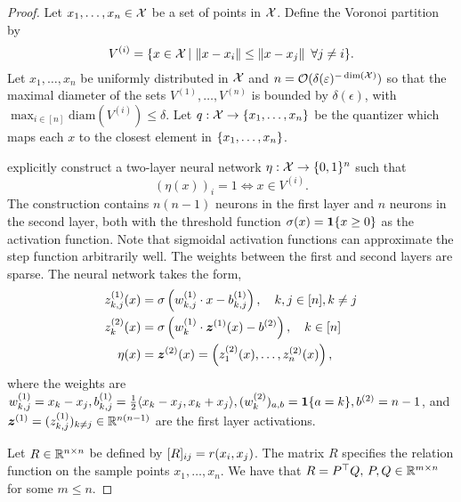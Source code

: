 \begin{proof}
    Let $x_1, \ldots, x_n \in {\mathcal{X}}$ be a set of points in ${\mathcal{X}}$. Define the Voronoi partition by
    \[V^{(i)} = \{x \in {\mathcal{X}} \,|\, \left\lVert x - x_i\right\rVert \leq \left\lVert x - x_j\right\rVert \ \forall j \neq i\}.\]
    Let $x_1, \ldots, x_n$ be uniformly distributed in ${\mathcal{X}}$ and $n = {\mathcal{O}}(\delta(\varepsilon)^{- \dim({\mathcal{X}})})$ so that the maximal diameter of the sets $V^{(1)}, \ldots, V^{(n)}$ is bounded by $\delta(\epsilon)$, with $\max_{i \in [n]} \mathrm{diam}(V^{(i)}) \leq \delta$. Let $q: {\mathcal{X}} \to \{x_1, \ldots, x_n\}$ be the quantizer which maps each $x$ to the closest element in $\{x_1, \ldots, x_n\}$.

    \citet{wuExplicitNeuralNetwork2018} explicitly construct a two-layer neural network $\eta:{\mathcal{X}} \to \{0, 1\}^{n}$ such that
    \[{(\eta(x))}_i = 1 \iff x \in V^{(i)}.\]
    The construction contains $n (n - 1)$ neurons in the first layer and $n$ neurons in the second layer, both with the threshold function $\sigma(x) = \bm{1}\{x \geq 0\}$ as the activation function. Note that sigmoidal activation functions can approximate the step function arbitrarily well. The weights between the first and second layers are sparse. The neural network takes the form,
    \begin{equation*}
        \begin{aligned}
            z_{k,j}^{(1)}(x) &= \sigma\left(w_{k,j}^{(1)} \cdot x - b_{k,j}^{(1)}\right), \quad k,j \in [n], k \neq j\\
            z_k^{(2)}(x) &= \sigma\left(w_k^{(1)} \cdot \bm{z}^{(1)}(x) - b^{(2)}\right), \quad k \in [n] \\
            \eta(x) &= \bm{z}^{(2)}(x) = \left(z_1^{(2)}(x), \ldots, z_n^{(2)}(x)\right),
        \end{aligned}
    \end{equation*}
    where the weights are $w_{k,j}^{(1)} = x_k - x_j, b_{k,j}^{(1)} = \frac{1}{2} \langle x_k - x_j, x_k + x_j \rangle, (w_{k}^{(2)})_{a,b} = \bm{1}\{a = k\}, b^{(2)} = n - 1$, and $\bm{z}^{(1)} = (z_{k,j}^{(1)})_{k \neq j} \in \mathbb{R}^{n (n - 1)}$ are the first layer activations.

    Let $R \in \mathbb{R}^{n \times n}$ be defined by $[R]_{ij} = r(x_i, x_j)$. The matrix $R$ specifies the relation function on the sample points $x_1, \ldots, x_n$. We have that $R = P^\top Q,\, P,Q \in \mathbb{R}^{m \times n}$ for some $m \leq n$. 


\end{proof}
